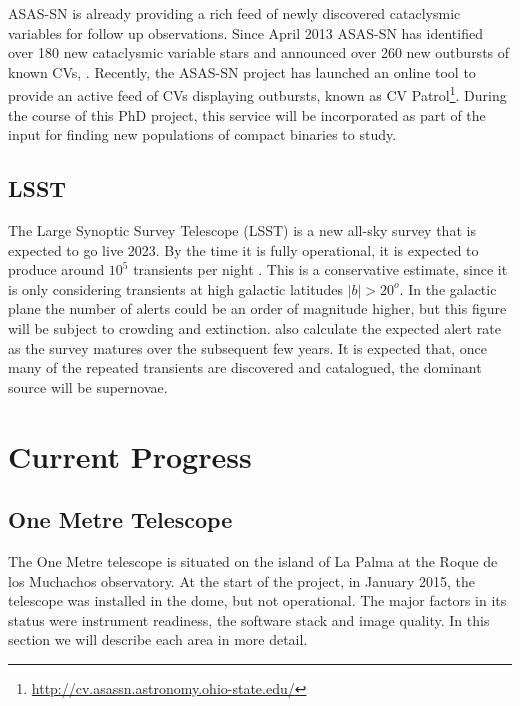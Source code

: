 \documentclass[a4paper,fleqn,usenatbib]{mnras}
\begin{document}
ASAS-SN is already providing a rich feed of newly discovered cataclysmic variables for follow up observations. Since April 2013 ASAS-SN has identified over 180 new cataclysmic variable stars and announced over 260 new outbursts of known CVs, \citep{Davis2015}. Recently, the ASAS-SN project has launched an online tool to provide an active feed of CVs displaying outbursts, known as CV Patrol\footnote{\url{http://cv.asassn.astronomy.ohio-state.edu/}}.  During the course of this PhD project, this service will be incorporated as part of the input for finding new populations of compact binaries to study.  

\subsection{LSST}
The Large Synoptic Survey Telescope (LSST) is a new all-sky survey that is expected to go live 2023. By the time it is fully operational, it is expected to produce around $10^5$ transients per night \citep{Ridgway2014}. This is a conservative estimate, since it is only considering transients at high galactic latitudes $|b| > 20^o$. In the galactic plane the number of alerts could be an order of magnitude higher, but this figure will be subject to crowding and extinction. \citet{Ridgway2014} also calculate the expected alert rate as the survey matures over the subsequent few years. It is expected that, once many of the repeated transients are discovered and catalogued, the dominant source will be supernovae. 


\section{Current Progress}

\subsection{One Metre Telescope}
The One Metre telescope is situated on the island of La Palma at the Roque de los Muchachos observatory. At the start of the project, in January 2015, the telescope was installed in the dome, but not operational. The major factors in its status were instrument readiness, the software stack and image quality. In this section we will describe each area in more detail. 
\end{document}
